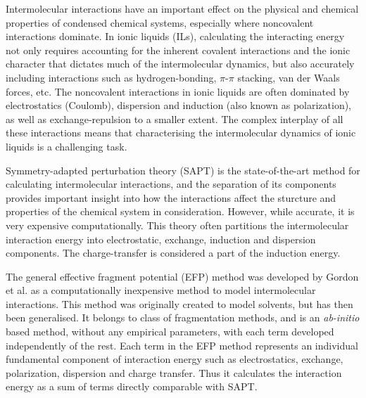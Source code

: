 

Intermolecular interactions have an important effect on the physical and chemical properties of condensed chemical systems, especially where noncovalent interactions dominate. 
In ionic liquids (ILs), calculating the interacting energy not only requires accounting for the inherent covalent interactions and the ionic character that dictates much of the intermolecular dynamics, but also accurately including interactions such as hydrogen-bonding, $\pi$-$\pi$ stacking, van der Waals forces, etc.
The noncovalent interactions in ionic liquids are often dominated by electrostatics (Coulomb), dispersion and induction (also known as polarization), as well as exchange-repulsion to a smaller extent. 
The complex interplay of all these interactions means that characterising the intermolecular dynamics of ionic liquids is a challenging task. 


Symmetry-adapted perturbation theory (SAPT) is the state-of-the-art method for calculating intermolecular interactions, and the separation of its components provides important insight into how the interactions affect the sturcture and properties of the chemical system in consideration.
However, while accurate, it is very expensive computationally. This theory often partitions the intermolecular interaction energy into electrostatic, exchange, induction and dispersion components. The charge-transfer is considered a part of the induction energy. 


The general effective fragment potential (EFP) method was developed by Gordon et al. 
as a computationally inexpensive method to model intermolecular interactions. 
This method was originally created to model solvents,
but has then been generalised.
It belongs to class of fragmentation methods, and is an \emph{ab-initio} based method, without any empirical parameters, with each term developed independently of the rest. Each term in the EFP method represents an individual fundamental component of interaction energy such as electrostatics, exchange, polarization, dispersion and charge transfer. Thus it calculates the interaction energy as a sum of terms directly comparable with SAPT.


